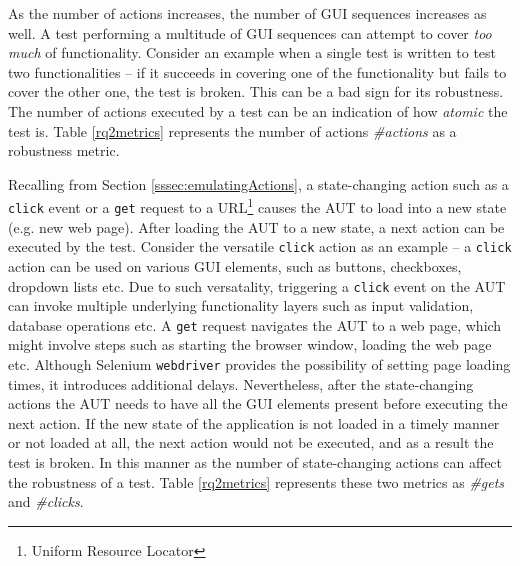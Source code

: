 As the number of actions increases, the number of GUI sequences increases as well. A test performing a multitude of GUI sequences can attempt to cover \textit{too much} of functionality. Consider an example when a single test is written to test two functionalities -- if it succeeds in covering one of the functionality but fails to cover the other one, the test is broken. This can be a bad sign for its robustness. 
The number of actions executed by a test can be an indication of how \textit{atomic} the test is. Table \ref{rq2metrics} represents the number of actions \textit{\#actions} as a robustness metric. 

Recalling from Section \ref{sssec:emulatingActions}, a state-changing action such as a \texttt{click} event or a \texttt{get} request to a URL\footnote{Uniform Resource Locator} causes the AUT to load into a new state (e.g. new web page). After loading the AUT to a new state, a next action can be executed by the test. Consider the versatile \texttt{click} action as an example -- a \texttt{click} action can be used on various GUI elements, such as buttons, checkboxes, dropdown lists etc. Due to such versatality, triggering a \texttt{click} event on the AUT can invoke multiple underlying functionality layers such as input validation, database operations etc. A \texttt{get} request navigates the AUT to a web page, which might involve steps such as starting the browser window, loading the web page etc. Although Selenium \texttt{webdriver} provides the possibility of setting page loading times, it introduces additional delays. Nevertheless, after the state-changing actions the AUT needs to have all the GUI elements present before executing the next action. If the new state of the application is not loaded in a timely manner or not loaded at all, the next action would not be executed, and as a result the test is broken. In this manner as the number of state-changing actions can affect the robustness of a test. Table \ref{rq2metrics} represents these two metrics as \textit{\#gets} and \textit{\#clicks}.


